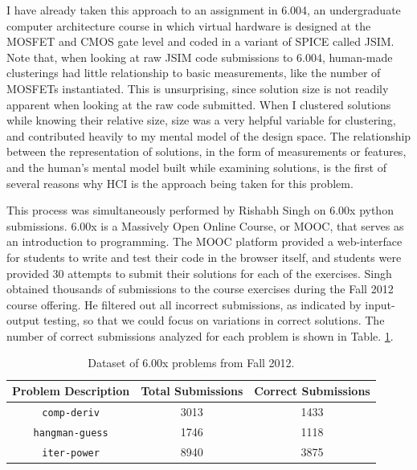 \documentclass[12pt]{article}
\newcommand\tabhead[1]{\small\textbf{#1}}
\newcommand\codevar[1]{\texttt{#1}}
\begin{document}
I have already taken this approach to an assignment in 6.004, an undergraduate computer architecture course in which virtual hardware is designed at the MOSFET and CMOS gate level and coded in a variant of SPICE called JSIM. Note that, when looking at raw JSIM code submissions to 6.004, human-made clusterings had little relationship to basic measurements, like the number of MOSFETs instantiated. This is unsurprising, since solution size is not readily apparent when looking at the raw code submitted. When I clustered solutions while knowing their relative size, size was a very helpful variable for clustering, and contributed heavily to my mental model of the design space. The relationship between the representation of solutions, in the form of measurements or features, and the human's mental model built while examining solutions, is the first of several reasons why HCI is the approach being taken for this problem.

This process was simultaneously performed by Rishabh Singh on 6.00x python submissions. 6.00x is a Massively Open Online Course, or MOOC, that serves as an introduction to programming. The MOOC platform provided a web-interface for students to write and test their code in the browser itself, and students were provided 30 attempts to submit their solutions for each of the exercises. Singh obtained thousands of submissions to the course exercises during the Fall 2012 course offering. He filtered out all incorrect submissions, as indicated by input-output testing, so that we could focus on variations in correct solutions. The number of correct submissions analyzed for each problem is shown in Table. \ref{table-edx-probs}. 

\begin{table}
\begin{tabular} {|c|c|c|}
\hline
\tabhead{Problem Description} & \tabhead{Total Submissions} & \tabhead {Correct Submissions} \\ \hline
\codevar{comp-deriv} & 3013 & 1433 \\ \hline
\codevar{hangman-guess} & 1746 & 1118 \\ \hline
\codevar{iter-power} & 8940 & 3875 \\ \hline
\end{tabular}
\caption{Dataset of 6.00x problems from Fall 2012.}
\label{table-edx-probs}
\end{table}
\end{document}

